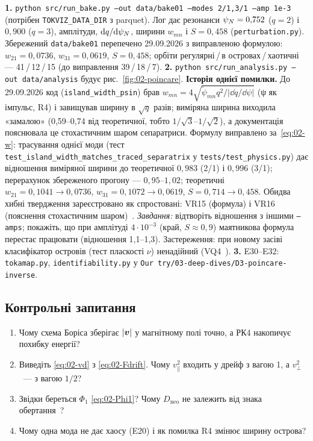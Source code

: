 \begin{practicum}
\textbf{1.} \texttt{python src/run\_bake.py --out data/bake01 --modes 2/1,3/1 --amp 1e-3} (потрібен \texttt{TOKVIZ\_DATA\_DIR} з parquet). Лог дає резонанси $\psi_{N}=0{,}752$ ($q=2$) і $0{,}900$ ($q=3$), амплітуди, $\mathrm{d} q/\mathrm{d}\psi_{N}$, ширини $w_{mn}$ і $S=0{,}458$ (\texttt{perturbation.py}). Збережений \texttt{data/bake01} перепечено 29.09.2026 з виправленою формулою: $w_{21}=0{,}0736$, $w_{31}=0{,}0619$, $S=0{,}458$; орбіти регулярні\,/\,в островах\,/\,хаотичні --- 41\,/\,12\,/\,15 (до виправлення 39\,/\,18\,/\,7).
\textbf{2.} \texttt{python src/run\_analysis.py --out data/analysis} будує рис.~\ref{fig:02-poincare}. \textbf{Історія однієї помилки.} До 29.09.2026 код (\texttt{island\_width\_psin}) брав $w_{mn}=4\sqrt{\tilde\psi_{mn}q^2/|\dd q/\dd\psi|}$ (ψ як імпульс, R4) і завищував ширину в $\sqrt q$ разів; виміряна ширина виходила «замалою» (0,59--0,74 від теоретичної, тобто $1/\sqrt3$--$1/\sqrt2$), а документація пояснювала це стохастичним шаром сепаратриси. Формулу виправлено за~\eqref{eq:02-w}: трасування однієї моди (тест \texttt{test\_island\_width\_matches\_traced\_separatrix} у \texttt{tests/test\_physics.py}) дає відношення виміряної ширини до теоретичної $0{,}983$ (2/1) і $0{,}996$ (3/1); перерахунок збереженого прогону --- $0{,}95$--$1{,}02$; теоретичні $w_{21}=0{,}1041\to0{,}0736$, $w_{31}=0{,}1072\to0{,}0619$, $S=0{,}714\to0{,}458$. Обидва хибні твердження зареєстровано як спростовані: VR15 (формула) і VR16 (пояснення стохастичним шаром)~\cite{ProjViz}. \emph{Завдання:} відтворіть відношення з іншими \texttt{--amps}; покажіть, що при амплітуді $4\cdot10^{-3}$ (край, $S\approx0{,}9$) маятникова формула перестає працювати (відношення 1,1--1,3). Застереження: при новому засіві класифікатор островів (тест пласкості $\nu$) ненадійний (VQ4~\cite{ProjViz}). \textbf{3.} E30--E32: \texttt{tokamap.py}, \texttt{identifiability.py} у \texttt{Our try/03-deep-dives/D3-poincare-inverse}.
\end{practicum}

\subsection*{Контрольні запитання}
\begin{enumerate}
  \item Чому схема Боріса зберігає $|\bm{v}|$ у магнітному полі точно, а РК4 накопичує похибку енергії?
  \item Виведіть \eqref{eq:02-vd} з \eqref{eq:02-Fdrift}. Чому $v_\parallel^2$ входить у дрейф з вагою 1, а $v_\perp^2$~--- з вагою $1/2$?
  \item Звідки береться $\Phi_1$ \eqref{eq:02-Phi1}? Чому $D_{\mathrm{neo}}$ не залежить від знака обертання~\cite{Wong1987}?
  \item Чому одна мода не дає хаосу (E20) і як помилка R4 змінює ширину острова?
\end{enumerate}

